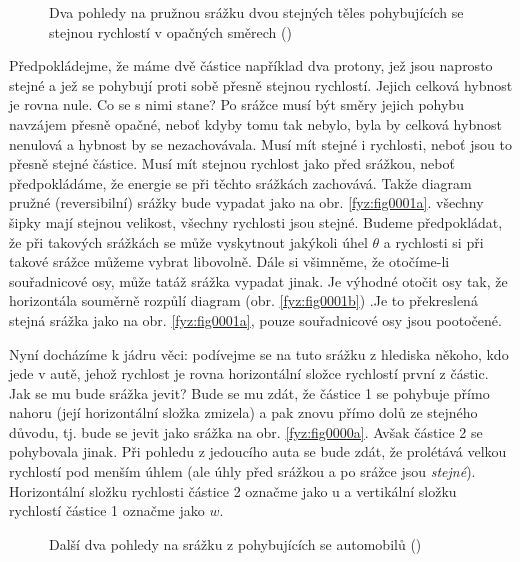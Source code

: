     \begin{figure}[ht!]  %
      \centering
      \caption{Dva pohledy na pružnou srážku dvou stejných těles pohybujících se stejnou rychlostí 
               v opačných směrech (\cite[s.~232]{Feynman01})}
      \label{fyz:fig0001}
    \end{figure}
    
    Předpokládejme, že máme dvě částice například dva protony, jež jsou naprosto stejné a jež se 
    pohybují proti sobě přesně stejnou rychlostí. Jejich celková hybnost je rovna nule. Co se s 
    nimi stane? Po srážce musí být směry jejich pohybu navzájem přesně opačné, neboť kdyby tomu tak 
    nebylo, byla by celková hybnost nenulová a hybnost by se nezachovávala. Musí mít stejné i 
    rychlosti, neboť jsou to přesně stejné částice. Musí mít stejnou rychlost jako před srážkou, 
    neboť předpokládáme, že energie se při těchto srážkách zachovává. Takže diagram pružné 
    (reversibilní) srážky bude vypadat jako na obr. \ref{fyz:fig0001a}. všechny šipky mají stejnou 
    velikost, všechny rychlosti jsou stejné. Budeme předpokládat, že při takových srážkách se může 
    vyskytnout jakýkoli úhel \(\theta\) a rychlosti si při takové srážce můžeme vybrat 
    libovolně. Dále si všimněme, že otočíme-li souřadnicové osy, může tatáž srážka vypadat jinak. 
    Je výhodné otočit osy tak, že horizontála souměrně rozpůlí diagram (obr. \ref{fyz:fig0001b}) .Je 
    to překreslená stejná srážka jako na obr. \ref{fyz:fig0001a}, pouze souřadnicové osy jsou 
    pootočené. 

    Nyní docházíme k jádru věci: podívejme se na tuto srážku z hlediska někoho, kdo jede v autě, 
    jehož rychlost je rovna horizontální složce rychlostí první z částic. Jak se mu bude srážka 
    jevit? Bude se mu zdát, že částice 1 se pohybuje přímo nahoru (její horizontální složka 
    zmizela) a pak znovu přímo dolů ze stejného důvodu, tj. bude se jevit jako srážka na obr. 
    \ref{fyz:fig0000a}. Avšak částice 2 se pohybovala jinak. Při pohledu z jedoucího auta se bude 
    zdát, že prolétává velkou rychlostí pod menším úhlem (ale úhly před srážkou a po srážce jsou 
    \emph{stejné}). Horizontální složku rychlosti částice 2 označme jako u a vertikální složku 
    rychlostí částice 1 označme jako \(w\).
    
    \begin{figure}[ht!]  %
      \centering
      \caption{Další dva pohledy na srážku z pohybujících se automobilů (\cite[s.~232]{Feynman01})}
      \label{fyz:fig0000}
    \end{figure}
    

